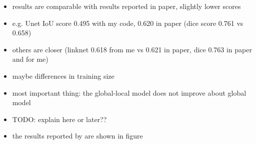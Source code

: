 \begin{itemize}
	\item results are comparable with results reported in paper, slightly lower scores
	\item e.g. Unet IoU score 0.495 with my code, 0.620 in paper (dice score 0.761 vs 0.658)
	\item others are closer (linknet 0.618 from me vs 0.621 in paper, dice 0.763 in paper and for me)
	\item maybe differences in training size
	\item most important thing: the global-local model does not improve about global model
	\item TODO: explain here or later??
	\item the results reported by \citeauthor{Oota_2023_WACV} are shown in figure
\end{itemize}
